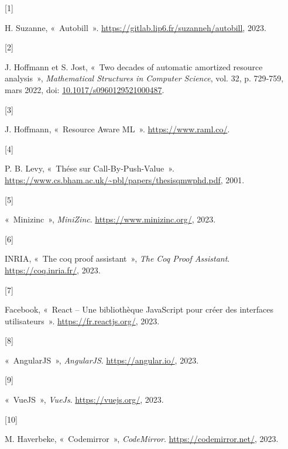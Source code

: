 \documentclass[
  12pt,
]{article}
\newlength{\cslhangindent}
\newlength{\csllabelwidth}
\newlength{\cslentryspacingunit} %
\newenvironment{CSLReferences}[2] %
 {%
  \setlength{\parindent}{0pt}
  \ifodd #1
  \let\oldpar\par
  \def\par{\hangindent=\cslhangindent\oldpar}
  \fi
  \setlength{\parskip}{#2\cslentryspacingunit}
 }%
 {}
\newcommand{\CSLLeftMargin}[1]{\parbox[t]{\csllabelwidth}{#1}}
\newcommand{\CSLRightInline}[1]{\parbox[t]{\linewidth - \csllabelwidth}{#1}\break}
\begin{document}
\hypertarget{refs}{}
\begin{CSLReferences}{0}{0}
  \leavevmode{}%
  \CSLLeftMargin{{[}1{]} }%
  \CSLRightInline{H. Suzanne, {«~Autobill~»}.
    \url{https://gitlab.lip6.fr/suzanneh/autobill}, 2023.}

  \leavevmode{}%
  \CSLLeftMargin{{[}2{]} }%
  \CSLRightInline{J. Hoffmann et S. Jost, {«~Two decades of automatic
        amortized resource analysis~»}, \emph{Mathematical Structures in
      Computer Science}, vol. 32, p. 729‑759, mars 2022, doi:
    \href{https://doi.org/10.1017/s0960129521000487}{10.1017/s0960129521000487}.}

  \leavevmode{}%
  \CSLLeftMargin{{[}3{]} }%
  \CSLRightInline{J. Hoffmann, {«~Resource Aware ML~»}.
    \url{https://www.raml.co/}.}

  \leavevmode{}%
  \CSLLeftMargin{{[}4{]} }%
  \CSLRightInline{P. B. Levy, {«~Thése sur Call-By-Push-Value~»}.
    \url{https://www.cs.bham.ac.uk/~pbl/papers/thesisqmwphd.pdf}, 2001.}

  \leavevmode{}%
  \CSLLeftMargin{{[}5{]} }%
  \CSLRightInline{{«~Minizinc~»}, \emph{MiniZinc}.
    \url{https://www.minizinc.org/}, 2023.}

  \leavevmode{}%
  \CSLLeftMargin{{[}6{]} }%
  \CSLRightInline{INRIA, {«~The coq proof assistant~»}, \emph{The Coq
      Proof Assistant}. \url{https://coq.inria.fr/}, 2023.}

  \leavevmode{}%
  \CSLLeftMargin{{[}7{]} }%
  \CSLRightInline{Facebook, {«~React -- Une bibliothèque JavaScript pour
        créer des interfaces utilisateurs~»}. \url{https://fr.reactjs.org/},
    2023.}

  \leavevmode{}%
  \CSLLeftMargin{{[}8{]} }%
  \CSLRightInline{{«~AngularJS~»}, \emph{AngularJS}.
    \url{https://angular.io/}, 2023.}

  \leavevmode{}%
  \CSLLeftMargin{{[}9{]} }%
  \CSLRightInline{{«~VueJS~»}, \emph{VueJs}. \url{https://vuejs.org/},
    2023.}

  \leavevmode{}%
  \CSLLeftMargin{{[}10{]} }%
  \CSLRightInline{M. Haverbeke, {«~Codemirror~»}, \emph{CodeMirror}.
    \url{https://codemirror.net/}, 2023.}


\end{CSLReferences}
\end{document}

